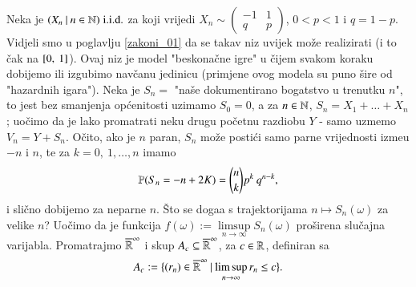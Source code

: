 \begin{pr}
    Neka je $({X_n} \: | \: {n \in \mathbb{N}}) \; \mathrm{i.i.d.}$ za koji vrijedi $X_n \sim \begin{pmatrix} -1 & 1\\ q & p \end{pmatrix}$, $0 < p < 1$ i $q = 1 - p$. Vidjeli smo u poglavlju \ref{zakoni_01} da se takav niz uvijek mo\v ze realizirati (i to \v cak na $[{0}, \:{1}]$).
    Ovaj niz je model "beskona\v cne igre" u \v cijem svakom koraku dobijemo ili izgubimo nav\v canu jedinicu (primjene ovog modela su puno \v sire od "hazardnih igara").
    Neka je $S_n =$ "na\v se dokumentirano bogatstvo u trenutku $n$", to jest bez smanjenja op\' cenitosti uzimamo $S_0 = 0$, a za $n \in \mathbb{N}$, $S_n = X_1 + \ldots + X_n$; uo\v cimo da je lako promatrati neku drugu po\v cetnu razdiobu $Y$ - samo uzmemo $V_n = Y + S_n$.
    O\v cito, ako je $n$ paran, $S_n$ mo\v ze posti\' ci samo parne vrijednosti izme\dj u $-n$ i $n$, te za $k = 0, \: 1, \ldots, n$ imamo
    \begin{equation*}
        \mathbb{P}({S_n = -n + 2K}) = {n \choose k} p^k \: q^{n - k},
    \end{equation*}
    i sli\v cno dobijemo za neparne $n$.
    \v Sto se doga\dj a s trajektorijama $n \mapsto S_n(\omega)$ za velike $n$?
    Uo\v cimo da je funkcija $f(\omega) := \limsup\limits_{n \to \infty} S_n(\omega)$ pro\v sirena slu\v cajna varijabla.
    Promatrajmo $\overline{\mathbb{R}}^{\infty}$ i skup $A_c \subseteq \overline{\mathbb{R}}^\infty$, za $c \in \mathbb{R}$, definiran sa
    \begin{equation*}
        A_c := \{{(r_n) \in \overline{\mathbb{R}}^\infty} \: | \: {\limsup\limits_{n \to \infty} r_n \leq c}\}.
    \end{equation*} 
\end{pr}